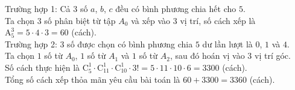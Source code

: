 \begin{ex}
{\begin{itemize}
		\end{itemize}
		Trường hợp 1: Cả $3$ số $a$, $b$, $c$ đều có bình phương chia hết cho $5$.\\
		Ta chọn $3$ số phân biệt từ tập $A_0$ và xếp vào $3$ vị trí, số cách xếp là $\mathrm{A}_5^3 = 5 \cdot 4 \cdot 3 = 60$ (cách).\\
		Trường hợp 2: $3$ số được chọn có bình phương chia $5$ dư lần lượt là $0$, $1$ và $4$.\\
		Ta chọn $1$ số từ $A_0$, $1$ số từ $A_1$ và $1$ số từ $A_2$, sau đó hoán vị vào $3$ vị trí góc.\\
		Số cách thực hiện là $\mathrm{C}_5^1 \cdot \mathrm{C}_{11}^1 \cdot \mathrm{C}_{10}^1 \cdot 3! = 5 \cdot 11 \cdot 10 \cdot 6 = 3300$ (cách).\\
		Tổng số cách xếp thỏa mãn yêu cầu bài toán là $60 + 3300 = 3360$ (cách).
	}
\end{ex}

